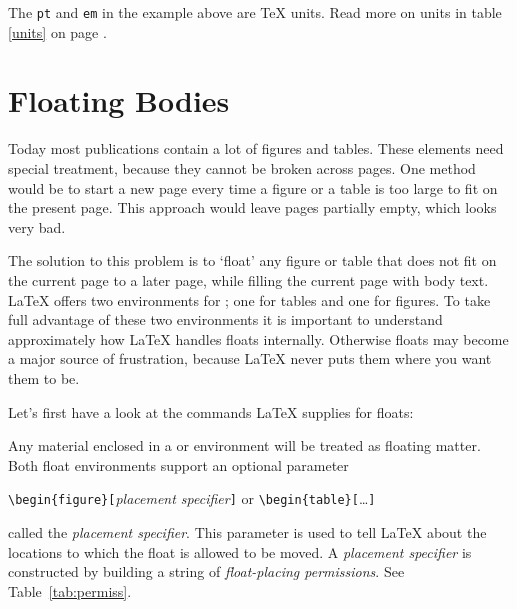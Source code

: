 The \texttt{pt} and \texttt{em} in the example above are \TeX{} units. Read more
on units in table \ref{units} on page \pageref{units}.

\section{Floating Bodies}
Today most publications contain a lot of figures and tables. These
elements need special treatment, because they cannot be broken across
pages.  One method would be to start a new page every time a figure or
a table is too large to fit on the present page. This approach would
leave pages partially empty, which looks very bad.

The solution to this problem is to `float' any figure or table that
does not fit on the current page to a later page, while filling the
current page with body text. \LaTeX{} offers two environments for
; one for tables and  one for figures.  To
take full advantage of these two environments it is important to
understand approximately how \LaTeX{} handles floats internally.
Otherwise floats may become a major source of frustration, because
\LaTeX{} never puts them where you want them to be.

\bigskip
Let's first have a look at the commands \LaTeX{} supplies
for floats:

Any material enclosed in a  or  environment will
be treated as floating matter. Both float environments support an optional
parameter
\begin{lscommand}
\verb|\begin{figure}[|\emph{placement specifier}\verb|]| or
\verb|\begin{table}[|\ldots\verb|]|
\end{lscommand}
\noindent called the \emph{placement specifier}. This parameter
is used to tell \LaTeX{} about the locations to which the float
is allowed to be moved.  A \emph{placement specifier} is constructed by building a string
of \emph{float-placing permissions}. See Table~\ref{tab:permiss}.

